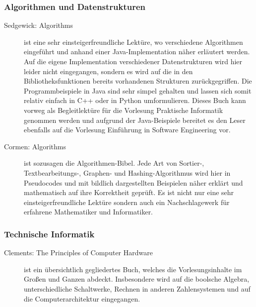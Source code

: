 \subsubsection{Algorithmen und Datenstrukturen}
\begin{description}

\item[Sedgewick: Algorithms]{
	ist eine sehr einsteigerfreundliche Lektüre, wo verschiedene Algorithmen eingeführt und anhand einer Java-Implementation näher erläutert werden. Auf die eigene Implementation verschiedener Datenstrukturen wird hier leider nicht eingegangen, sondern es wird auf die in den Bibliotheksfunktionen bereits vorhandenen Strukturen zurückgegriffen. Die Programmbeispiele in Java sind sehr simpel gehalten und lassen sich somit relativ einfach in C++ oder in Python umformulieren. Dieses Buch kann vorweg als Begleitlektüre für die Vorlesung Praktische Informatik genommen werden und aufgrund der Java-Beispiele bereitet es den Leser ebenfalls auf die Vorlesung Einführung in Software Engineering vor.} 

\item[Cormen: Algorithms]{
	ist sozusagen die Algorithmen-Bibel. Jede Art von Sortier-, Textbearbeitungs-, Graphen- und Hashing-Algorithmus wird hier in Pseudocodes und mit bildlich dargestellten Beispielen näher erklärt und mathematisch auf ihre Korrektheit geprüft. Es ist nicht nur eine sehr einsteigerfreundliche Lektüre sondern auch ein Nachschlagewerk für erfahrene Mathematiker und Informatiker.}
\end{description}

\subsubsection{Technische Informatik}
\begin{description}
\item[Clements: The Principles of Computer Hardware]{
	ist ein übersichtlich gegliedertes Buch, welches die Vorlesungsinhalte im Großen und Ganzen abdeckt. Insbesondere wird   auf die boolsche Algebra, unterschiedliche Schaltwerke, Rechnen in anderen Zahlensystemen und auf die Computerarchitektur eingegangen.}
\end{description}

